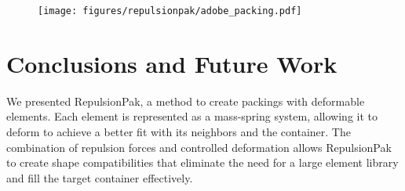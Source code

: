\begin{figure}
\centering
\texttt{[image: figures/repulsionpak/adobe\_packing.pdf]} 
\caption[A RepulsionPak packing printed on a t-shirt]
{\label{adobe_packing}
}
\end{figure}







\section{Conclusions and Future Work}
\label{repulsionpak_conclusions}


We presented RepulsionPak, a method to create packings with deformable elements.
Each element is represented as a
mass-spring system, allowing it to deform to achieve a better fit with
its neighbors and the container.
The combination of repulsion forces and controlled deformation
allows RepulsionPak to create shape compatibilities that
eliminate the need for a large element library
and fill the target container effectively.



